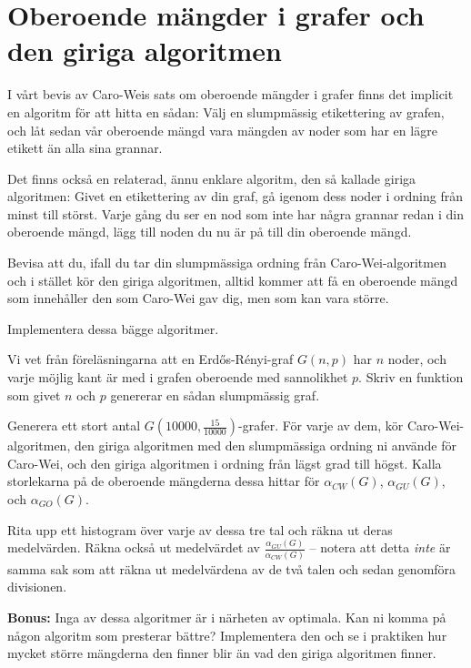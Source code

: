 \documentclass[nobib]{tufte-handout}
\begin{document}
\section{Oberoende mängder i grafer och den giriga algoritmen}

I vårt bevis av Caro-Weis sats om oberoende mängder i grafer finns det implicit en algoritm för att hitta en sådan: Välj en slumpmässig etikettering av grafen, och låt sedan vår oberoende mängd vara mängden av noder som har en lägre etikett än alla sina grannar.

Det finns också en relaterad, ännu enklare algoritm, den så kallade giriga algoritmen: Givet en etikettering av din graf, gå igenom dess noder i ordning från minst till störst. Varje gång du ser en nod som inte har några grannar redan i din oberoende mängd, lägg till noden du nu är på till din oberoende mängd.

\begin{xca}
    Bevisa att du, ifall du tar din slumpmässiga ordning från Caro-Wei-algoritmen och i stället kör den giriga algoritmen, alltid kommer att få en oberoende mängd som innehåller den som Caro-Wei gav dig, men som kan vara större.
\end{xca}

\begin{xca}
    Implementera dessa bägge algoritmer.
\end{xca}

\begin{xca}
    Vi vet från föreläsningarna att en Erd\H{o}s-Rényi-graf $G(n,p)$ har $n$ noder, och varje möjlig kant är med i grafen oberoende med sannolikhet $p$. Skriv en funktion som givet $n$ och $p$ genererar en sådan slumpmässig graf.
\end{xca}

\begin{xca}
    Generera ett stort antal $G\left(10000, \frac{15}{10000}\right)$-grafer. För varje av dem, kör Caro-Wei-algoritmen, den giriga algoritmen med den slumpmässiga ordning ni använde för Caro-Wei, och den giriga algoritmen i ordning från lägst grad till högst. Kalla storlekarna på de oberoende mängderna dessa hittar för $\alpha_{CW}(G)$, $\alpha_{GU}(G)$, och $\alpha_{GO}(G)$.

    Rita upp ett histogram över varje av dessa tre tal och räkna ut deras medelvärden. Räkna också ut medelvärdet av $\frac{\alpha_{GU}(G)}{\alpha_{CW}(G)}$ -- notera att detta \emph{inte} är samma sak som att räkna ut medelvärdena av de två talen och sedan genomföra divisionen.
\end{xca}

\textbf{Bonus:} Inga av dessa algoritmer är i närheten av optimala. Kan ni komma på någon algoritm som presterar bättre? Implementera den och se i praktiken hur mycket större mängderna den finner blir än vad den giriga algoritmen finner.

%
%
\end{document}
